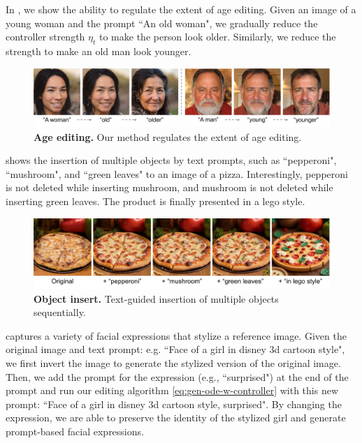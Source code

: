 \documentclass{article} %
\theoremstyle{plain}
\begin{document}
In , we show the ability to regulate the extent of age editing. 
Given an image of a young woman and the prompt ``An old woman", we gradually reduce the controller strength $\eta_t$ to make the person look older. Similarly, we reduce the strength to make an old man look younger. 

\begin{figure}[!tbh]
\includegraphics[width=\linewidth]{pics/age-edit_low.pdf}
\caption{
\textbf{Age editing.} 
Our method regulates the extent of age editing. 
}
\label{fig:age-edit}
\end{figure}


 shows the insertion of multiple objects by text prompts, such as ``pepperoni", ``mushroom", and ``green leaves" to an image of a pizza.
Interestingly, pepperoni is not deleted while inserting mushroom, and mushroom is not deleted while inserting green leaves.
The product is finally presented in a lego style.


\begin{figure}[!tbh]
\includegraphics[width=\linewidth]{pics/seq-edit_low.pdf}
\caption{
\textbf{Object insert.} 
Text-guided insertion of multiple objects sequentially.
}
\label{fig:seq-edit}
\end{figure}

 captures a variety of facial expressions that stylize a reference image. 
Given the original image and text prompt: e.g. ``Face of a girl in disney 3d cartoon style", we first invert the image to generate the stylized version of the original image.
Then, we add the prompt for the expression (e.g., ``surprised") at the end of the prompt and run our editing algorithm \eqref{eq:gen-ode-w-controller} with this new prompt: ``Face of a girl in disney 3d cartoon style, surprised". 
By changing the expression, we are able to preserve the identity of the stylized girl and generate prompt-based facial expressions. 
\end{document}
